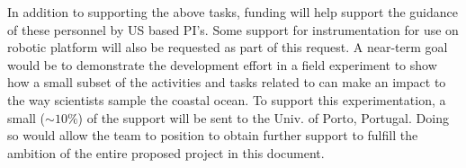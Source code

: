 \noindent
In addition to supporting the above tasks, \kck funding will help
support the guidance of these personnel by US based PI's. Some support
for instrumentation for use on robotic platform will also be requested
as part of this request.  A near-term goal would be to demonstrate the
development effort in a field experiment to show how a small subset of
the activities and tasks related to \pro can make an impact to the way
scientists sample the coastal ocean. To support this experimentation, a
small ($\sim 10\%$) of the support will be sent to the Univ. of Porto,
Portugal. Doing so would allow the team to position \pro to obtain
further support to fulfill the ambition of the entire proposed project
in this document.

